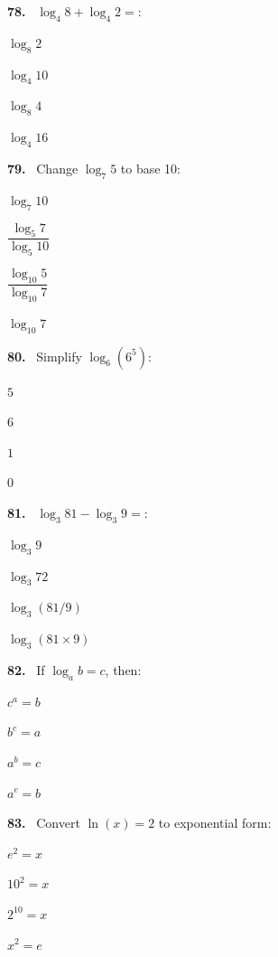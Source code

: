 \documentclass[11pt]{article}
\newenvironment{qenv}[1]{%
  \par\medskip\noindent\textbf{#1.}\ \ignorespaces
}{\par}
\begin{document}
\begin{qenv}{78} $\log_4 8 + \log_4 2 = $:
\begin{options} \item $\log_8 2$ \item $\log_4 10$ \item $\log_8 4$ \item $\log_4 16$ \end{options} \end{qenv}

\begin{qenv}{79} Change $\log_7 5$ to base 10:
\begin{options} \item $\log_7 10$ \item $\dfrac{\log_5 7}{\log_5 10}$ \item $\dfrac{\log_{10} 5}{\log_{10} 7}$ \item $\log_{10} 7$ \end{options} \end{qenv}

\begin{qenv}{80} Simplify $\log_6(6^5)$:
\begin{options} \item $5$ \item $6$ \item $1$ \item $0$ \end{options} \end{qenv}

\begin{qenv}{81} $\log_3 81 - \log_3 9 = $:
\begin{options} \item $\log_3 9$ \item $\log_3 72$ \item $\log_3(81/9)$ \item $\log_3(81\times9)$ \end{options} \end{qenv}

\begin{qenv}{82} If $\log_a b = c$, then:
\begin{options} \item $c^a=b$ \item $b^c=a$ \item $a^b=c$ \item $a^c=b$ \end{options} \end{qenv}

\begin{qenv}{83} Convert $\ln(x)=2$ to exponential form:
\begin{options} \item $e^2=x$ \item $10^2=x$ \item $2^{10}=x$ \item $x^2=e$ \end{options} \end{qenv}
\end{document}
